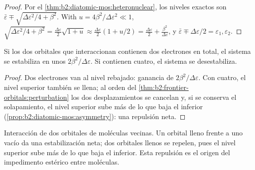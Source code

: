 \begin{proof}
Por el \cref{thm:b2:diatomic-mos:heteronuclear}, los niveles exactos son $\bar\varepsilon \mp
\sqrt{\Delta\varepsilon^2/4 + \beta^2}$. With $u = 4\beta^2/\Delta\varepsilon^2 \ll 1$, $\sqrt{\Delta\varepsilon^2/4
+ \beta^2} = \frac{\Delta\varepsilon}{2}\sqrt{1 + u} \approx \frac{\Delta\varepsilon}{2}(1 + u/2) =
\frac{\Delta\varepsilon}{2} + \frac{\beta^2}{\Delta\varepsilon}$, y $\bar\varepsilon \mp \Delta\varepsilon/2 = \varepsilon_1,
\varepsilon_2$.
\end{proof}

\begin{proposition}\label{prop:b2:frontier-orbitals:four-electron}
Si los dos orbitales que interaccionan contienen dos electrones en total, el sistema se estabiliza
en unos $2\beta^2/\Delta\varepsilon$. Si contienen cuatro, el sistema se desestabiliza.
\end{proposition}

\begin{proof}
Dos electrones van al nivel rebajado: ganancia de $2\beta^2/\Delta\varepsilon$. Con cuatro, el nivel superior
también se llena; al orden del \cref{thm:b2:frontier-orbitals:perturbation} los dos
desplazamientos se cancelan y, si se conserva el solapamiento, el nivel superior sube más de lo que
baja el inferior (\cref{prop:b2:diatomic-mos:asymmetry}): una repulsión neta.
\end{proof}

\begin{omfigure}

{\small Interacción de dos orbitales de moléculas vecinas. Un orbital lleno
frente a uno vacío da una estabilización neta; dos orbitales llenos se repelen, pues el
nivel superior sube más de lo que baja el inferior. Esta repulsión es el origen
del impedimento estérico entre moléculas.}
\end{omfigure}

